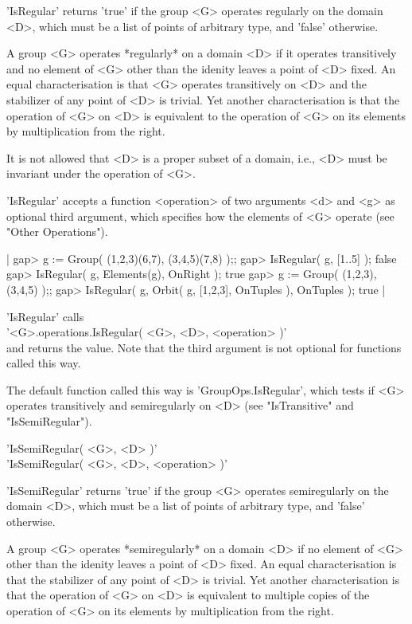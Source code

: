 'IsRegular'  returns 'true'  if  the group <G>  operates regularly on the
domain <D>, which must be a list of points of arbitrary type, and 'false'
otherwise.

A  group  <G>  operates *regularly*  on  a  domain  <D>  if  it  operates
transitively and no element of <G>  other than the idenity leaves a point
of   <D>   fixed.   An  equal   characterisation  is  that  <G>  operates
transitively on <D> and the stabilizer  of any  point  of <D> is trivial.
Yet  another  characterisation  is  that the operation of <G>  on <D>  is
equivalent to the operation of <G> on its elements by multiplication from
the right.

It is not allowed that <D> is a proper subset of a domain, i.e., <D> must
be invariant under the operation of <G>.

'IsRegular'  accepts a function <operation> of two  arguments <d> and <g>
as  optional  third  argument, which specifies  how  the elements  of <G>
operate (see "Other Operations").

|    gap> g := Group( (1,2,3)(6,7), (3,4,5)(7,8) );;
    gap> IsRegular( g, [1..5] );
    false
    gap> IsRegular( g, Elements(g), OnRight );
    true
    gap> g := Group( (1,2,3), (3,4,5) );;
    gap> IsRegular( g, Orbit( g, [1,2,3], OnTuples ), OnTuples );
    true |

'IsRegular' calls \\
'<G>.operations.IsRegular( <G>, <D>, <operation> )' \\
and returns the  value.  Note that the third argument is not optional for
functions called this way.

The default function called this way is 'GroupOps.IsRegular', which tests
if <G> operates transitively and semiregularly on <D> (see "IsTransitive"
and "IsSemiRegular").


'IsSemiRegular( <G>, <D> )'\\
'IsSemiRegular( <G>, <D>, <operation> )'

'IsSemiRegular' returns 'true' if the group <G> operates semiregularly on
the domain  <D>, which must  be  a list of  points of arbitrary type, and
'false' otherwise.

A group <G> operates *semiregularly* on a domain <D> if no element of <G>
other  than  the   idenity  leaves  a  point  of  <D>  fixed.   An  equal
characterisation is  that the stabilizer of any point of <D> is  trivial.
Yet  another characterisation  is that  the operation  of <G>  on <D>  is
equivalent to multiple copies of the operation  of <G> on its elements by
multiplication from the right.

